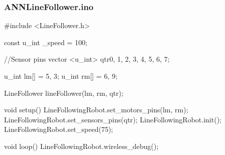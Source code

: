 \documentclass[14pt,a4paper]{extarticle}
\begin{document}
	\subsubsection{ANNLineFollower.ino}
	
	\begin{spverbatim}
#include <LineFollower.h>

const u_int _speed = 100;

//Sensor pins
vector <u_int> qtr{0, 1, 2, 3, 4, 5, 6, 7};

u_int lm[] = {5, 3};
u_int rm[] = {6, 9};

LineFollower lineFollower(lm, rm, qtr);

void setup()
{
  LineFollowingRobot.set_motors_pins(lm, rm);
  LineFollowingRobot.set_sensors_pins(qtr);
  LineFollowingRobot.init();
  LineFollowingRobot.set_speed(75);
}

void loop()
{
  LineFollowingRobot.wireless_debug();
}
	\end{spverbatim}
\end{document}

